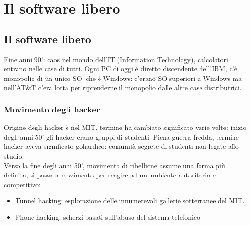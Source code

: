 \documentclass[12pt, oneside]{extbook}
\begin{document}
\chapter{Il software libero}
\section{Il software libero}
Fine anni 90': caos nel mondo dell'IT (Information Technology), calcolatori entrano nelle case di tutti. Ogni PC di oggi è diretto discendente dell'IBM, c'è monopolio di un unico SO, che è Windows: c'erano SO superiori a Windows ma nell'AT\&T c'era lotta per riprenderne il monopolio dalle altre case distributrici.
\subsection{Movimento degli hacker}
Origine degli hacker è nel MIT, termine ha cambiato significato varie volte: inizio degli anni 50' gli hacker erano gruppi di studenti. Piena guerra fredda, termine hacker aveva significato goliardico: comunità segrete di studenti non legate allo studio.\\ Verso la fine degli anni 50', movimento di ribellione assume una forma più definita, si passa a movimento per reagire ad un ambiente autoritario e competitivo:
\begin{itemize}
\item Tunnel hacking: esplorazione delle innumerevoli gallerie sotterranee del MIT.
\item Phone hacking: scherzi basati sull'abuso del sistema telefonico
\end{itemize}
\end{document}
